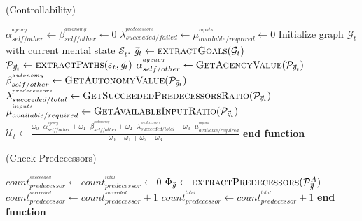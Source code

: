 \documentclass{article}
\begin{document}
\begin{algorithm}
	\caption{(Controllability)}
	\label{array-sum}
	\begin{algorithmic}[1]
			\Statex
			\State $\alpha_{self/other}^{^{agency}} \gets
			\beta_{self/other}^{^{autonomy}} \gets 0$
			\Statex
			\State $\lambda_{succeeded/failed}^{^{predecessors}} \gets
			\mu_{available/required}^{^{inputs}} \gets 0$
			\Statex
			\State Initialize graph $\mathcal{G}_{t}$ with current mental state
			$\mathcal{S}_{t}$.
			\Statex
			\State $\vec{\mathit{g}}_{t} \gets \Call{extractGoals}{\mathcal{G}_{t}}$ 
			\State $\mathcal{P}_{\vec{\mathit{g}}_{t}} \gets
			\Call{extractPaths}{\varepsilon_t, \vec{\mathit{g}}_{t}}$
			\Statex
			\State $\alpha_{self/other}^{^{agency}} \gets
			\Call{GetAgencyValue}{\mathcal{P}_{\vec{\mathit{g}}_{t}}}$ 
			\Statex
			\State $\beta_{self/other}^{^{autonomy}} \gets
			\Call{GetAutonomyValue}{\mathcal{P}_{\vec{\mathit{g}}_{t}}}$
			\Statex
			\State $\lambda_{succeeded/total}^{^{predecessors}} \gets
			\Call{GetSucceededPredecessorsRatio}{\mathcal{P}_{\vec{\mathit{g}}_{t}}}$
			\Statex
			\State $\mu_{available/required}^{^{inputs}} \gets
			\Call{GetAvailableInputRatio}{\mathcal{P}_{\vec{\mathit{g}}_{t}}}$
			\State $\mathcal{U}_{t} \gets
			\frac{\omega_{0}\cdot \alpha_{self/other}^{^{agency}} +
			\omega_{1}\cdot \beta_{self/other}^{^{autonomy}} + \omega_{2}\cdot
			\lambda_{succeeded/total}^{^{predecessors}} + \omega_{3}\cdot
			\mu_{available/required}^{^{inputs}}}{\omega_{0} + \omega_{1} + \omega_{2} +
			\omega_{3}}$
			\Statex
				\State {}
			\Else
				\State {}
			\EndIf
		\EndFunction
		\State \textbf{end function}
		\end{algorithmic}
	\end{algorithm}
	
\pagebreak
	
\begin{algorithm}
	\caption{(Check Predecessors)}
	\label{array-sum}
	\begin{algorithmic}[1]
			\Statex
			\State $count_{predecessor}^{^{succeeded}} \gets
			count_{predecessor}^{^{total}} \gets 0$
			\Statex
			\State $\Phi_{\vec{\mathit{g}}} \gets
			\Call{extractPredecessors}{\mathcal{P}_{\vec{\mathit{g}}}^{A}}$
			\Statex
					\State $count_{predecessor}^{^{succeeded}} \gets count_{predecessor}^{^{succeeded}} + 1$
				\EndIf
				\State $count_{predecessor}^{^{total}} \gets count_{predecessor}^{^{total}} + 1$
			\EndFor
			\Statex
			\State {}
		\EndFunction 
	\State \textbf{end function}
	\end{algorithmic}
\end{algorithm}
\end{document}
